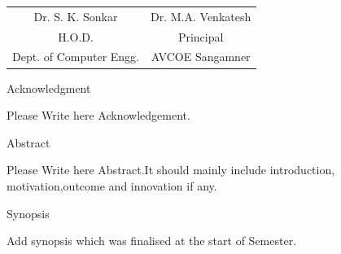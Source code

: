 \documentclass[oneside,a4paper,12pt]{report}
\begin{document}
\begin{tabular}{c c }
Dr. S. K. Sonkar &  \hspace{50 mm} Dr. M.A. Venkatesh \\								
H.O.D.   &  \hspace{50 mm} Principal \\
Dept. of Computer Engg.  &	\hspace{50 mm}AVCOE Sangamner  \\
\end{tabular}



\newpage

\setcounter{page}{0}
\frontmatter
{}
\rfoot{\thepage}



\newpage
{\fontsize{16}{15} \bfseries \LARGE \selectfont \centerline{Acknowledgment}}
\vspace{10mm}

Please Write here Acknowledgement. 

\newpage
{\fontsize{16}{15} \bfseries \LARGE \selectfont \centerline{Abstract}}
\vspace{10mm}

Please Write here Abstract.It should mainly include introduction, motivation,outcome and innovation if any.\\

\newpage
{\fontsize{16}{15} \bfseries \LARGE \selectfont \centerline{Synopsis}}
\vspace{10mm}

Add synopsis which was finalised at the start of Semester. 
\end{document}
